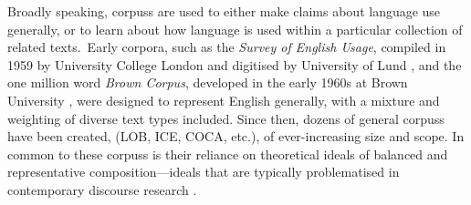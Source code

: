 Broadly speaking, \glspl{corpus} are used to either make claims about language use generally, or to learn about how language is used within a particular collection of related texts.~Early corpora, such as the \emph{Survey of English Usage}, compiled in 1959 by University College London and digitised by University of Lund \cite{quirk_towards_1960}, and the one million word \emph{Brown Corpus}, developed in the early 1960s at Brown University \cite{meyer_english_2002}, were designed to represent English generally, with a mixture and weighting of diverse text types included. Since then, dozens of general \glspl{corpus} have been created, (LOB, ICE, COCA, etc.), of ever-increasing size and scope. In common to these \glspl{corpus} is their reliance on theoretical ideals of balanced and representative composition---ideals that are typically problematised in contemporary discourse research \cite{baker_acceptable_2012}.





